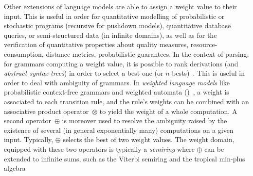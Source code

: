 Other extensions of language models  %
are able to assign a weight value to their input.
This is useful in order for quantitative modelling 
\eg of probabilistic or stochastic programs (recursive for pushdown models),
quantitative database queries, or semi-structured data (in infinite domains), 
as well as for the verification of quantitative properties about 
quality measures, resource-consumption, distance metrics, probabilistic guarantees, \etc
%
In the context of parsing, for grammars computing a weight value, 
it is possible to rank derivations (and \emph{abstract syntax trees})
in order to select a best one 
(or $n$ bests)~\cite{Goodman99SemiringParsing,Nederhof03weightedParsing,MorbitzVogler19weighted-parsing-parsing}. 
This is useful in order to deal with ambiguity of grammars.
%
In \emph{weighted language models}
like \eg probabilistic context-free grammars %
and weighted automata (\WA)~\cite{Droste09handbook},
a weight is associated to each transition rule, %
and the rule's weights can be combined with an
associative product operator~$\otimes$ to yield the weight of a whole computation.
A second operator~$\oplus$
is moreover used to resolve the ambiguity raised by the existence
of several (in general exponentially many) computations on a given input.
Typically, $\oplus$ selects the best of two weight values.
The weight domain, equipped with these two operators is typically 
a \emph{semiring} %
where $\oplus$ can be extended to infinite sums,
such as the Viterbi semiring and the tropical min-plus algebra%

